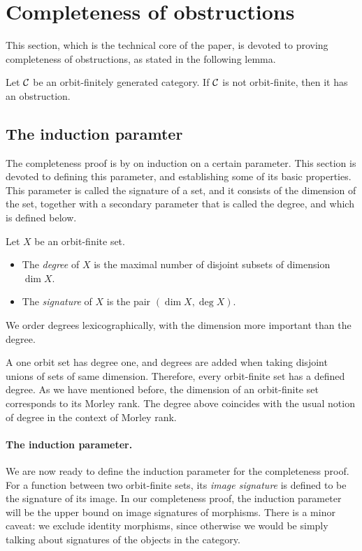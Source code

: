 
\section{Completeness of obstructions}
\label{sec:completeness-of-obstructions}


This section, which is the technical core of the paper, is devoted to proving  completeness of obstructions, as stated in the following lemma.
\begin{lemma}\label{lem:completeness-of-obstructions}
    Let ${\mathcal C}$ be an orbit-finitely generated category. If ${\mathcal C}$ is not orbit-finite, then it has an obstruction.
\end{lemma}



\subsection{The induction paramter}
\label{sec:induction-parameter}
The completeness proof is by on induction on a certain parameter. This section is devoted to defining this parameter, and establishing some of its basic properties. This parameter is called the signature of a set, and it consists of the dimension of the set, together with a secondary parameter that is called the degree, and which is defined below.


\begin{definition}
    Let $X$ be an orbit-finite set.
    \begin{itemize}
        \item The \emph{degree} of $X$ is the maximal number of disjoint subsets of dimension $\dim X$.
        \item The \emph{signature} of $X$ is the pair $(\dim X, \deg X)$.
    \end{itemize}
 We order degrees lexicographically, with the dimension more important than the degree.
\end{definition}

    A one orbit set has degree one, and degrees are added when taking disjoint unions of sets of same dimension. Therefore, every orbit-finite set has a defined degree.
As we have mentioned before, the dimension of an orbit-finite set corresponds to its Morley rank. The degree above coincides with the usual notion of degree in the context of Morley rank.

\paragraph*{The induction parameter.} We are now ready to define the induction parameter for the completeness proof.
For a function between two orbit-finite sets, its \emph{image signature} is defined to be the signature of its image. In our completeness proof, the induction parameter will be the upper bound on image signatures of morphisms. There is a minor caveat: we exclude identity morphisms, since otherwise we would be simply talking about signatures of the objects in the category.


